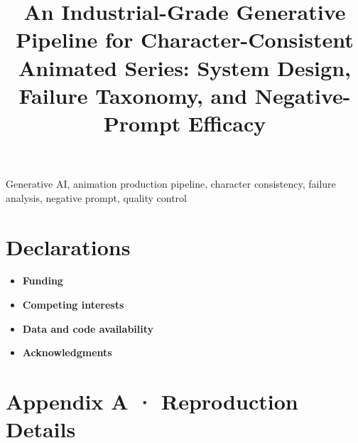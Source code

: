 \documentclass[runningheads]{llncs}
\begin{document}
\title{An Industrial-Grade Generative Pipeline for Character-Consistent
       Animated Series: System Design, Failure Taxonomy, and
       Negative-Prompt Efficacy}

\author{\theauthor{}}
\institute{\theaffil}
\email{\theemail}

\maketitle

\begin{abstract}
\end{abstract}

\begin{keywords}
Generative AI, animation production pipeline, character consistency,
failure analysis, negative prompt, quality control
\end{keywords}









\section{Declarations}
\begin{itemize}
  \item[--] \textbf{Funding}         %
  \item[--] \textbf{Competing interests}
  \item[--] \textbf{Data and code availability}
  \item[--] \textbf{Acknowledgments}
\end{itemize}




\appendix
\section{Appendix A · Reproduction Details}
\end{document}
